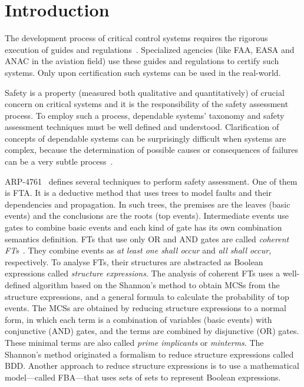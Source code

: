 \chapter{Introduction}
\label{chap:intro}

The development process of critical control systems requires the rigorous execution of guides and regulations~\cite{ANAC2011,FAA1993,FAA2007,SAE1996b}.
Specialized agencies (like \ac{FAA}, \ac{EASA} and \ac{ANAC} in the aviation field) use these guides and regulations to certify such systems.
Only upon certification such systems can be used in the real-world.

Safety is a property (measured both qualitative and quantitatively) of crucial concern on critical systems and it is the responsibility of the safety assessment process.
To employ such a process, dependable systems' taxonomy and safety assessment techniques must be well defined and understood.
Clarification of concepts of dependable systems can be surprisingly difficult when systems are complex, because the determination of possible causes or consequences of failures can be a very subtle process~\cite{ALR+2004}.

ARP-4761~\cite{SAE1996b} defines several techniques to perform safety assessment.
One of them is \ac{FTA}.
It is a deductive method that uses trees to model faults and their dependencies and propagation.
In such trees, the premises are the leaves (basic events) and the conclusions are the roots (top events).
Intermediate events use gates to combine basic events and each kind of gate has its own combination semantics definition.
\Acp{FT} that use only \ac{OR} and \ac{AND} gates are called \emph{coherent \aclp{FT}}~\cite{Andrews2001,AB2003,Oliv2006,CCR2008,Vaurio2016}.
They combine events as \emph{at least one shall occur} and \emph{all shall occur}, respectively.
To analyse \acp{FT}, their structures are abstracted as Boolean expressions called \emph{structure expressions}.
The analysis of coherent \acp{FT} uses a well-defined algorithm based on the Shannon's method to obtain \acp{MCS} from the structure expressions, and a general formula to calculate the probability of top events.
The \acp{MCS} are obtained by reducing structure expressions to a normal form, in which each term is a combination of variables (basic events) with conjunctive (\ac{AND}) gates, and the terms are combined by disjunctive (\ac{OR}) gates.
These minimal terms are also called \emph{prime implicants} or \emph{minterms}.
The Shannon's method originated a formalism to reduce structure expressions called \ac{BDD}.
Another approach to reduce structure expressions is to use a mathematical model---called \acf{FBA}---that uses sets of sets to represent Boolean expressions.

